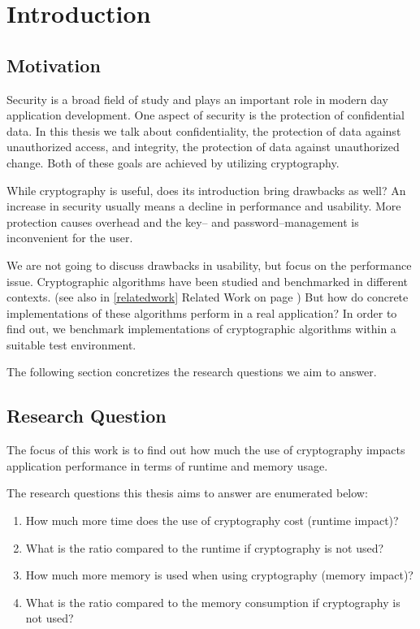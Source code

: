 \chapter{Introduction}

\section{Motivation}

Security is a broad field of study and plays an important role in modern day application development.
One aspect of security is the protection of confidential data.
In this thesis we talk about confidentiality, the protection of data against unauthorized access, and integrity, the protection of data against unauthorized change.
Both of these goals are achieved by utilizing cryptography.

While cryptography is useful, does its introduction bring drawbacks as well?
An increase in security usually means a decline in performance and usability.
More protection causes overhead and the key-- and password--management is inconvenient for the user.

We are not going to discuss drawbacks in usability, but focus on the performance issue.
Cryptographic algorithms have been studied and benchmarked in different contexts.\cite{thakur2011aes,Gupta:2002:PAE:570681.570691} (see also in \ref{relatedwork} Related Work on page \pageref{relatedwork})
But how do concrete implementations of these algorithms perform in a real application?
In order to find out, we benchmark implementations of cryptographic algorithms within a suitable test environment.

The following section concretizes the research questions we aim to answer.

\section{Research Question}

The focus of this work is to find out how much the use of cryptography
impacts application performance in terms of runtime and memory
usage.

The research questions this thesis aims to answer are enumerated below:

\begin{enumerate}
\def\labelenumi{\arabic{enumi}.}
\tightlist
\item
  How much more time does the use of cryptography cost (runtime impact)?
\item
  What is the ratio compared to the runtime if cryptography is not used?
\item
  How much more memory is used when using cryptography (memory impact)?
\item
  What is the ratio compared to the memory consumption if cryptography
  is not used?
\end{enumerate}

